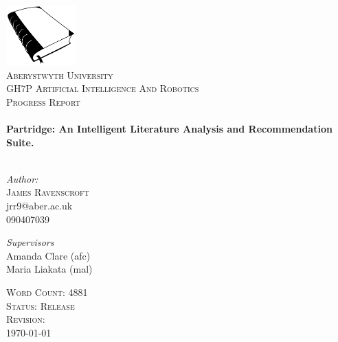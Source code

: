 \begin{titlepage}
 
\begin{center}

\includegraphics[width=0.20\textwidth]{../cover_logo.png}\\[1cm]


\textsc{\LARGE Aberystwyth University}\\[0.5cm]
\textsc{\LARGE GH7P Artificial Intelligence And Robotics}\\
\textsc{\LARGE Progress Report}\\[0.5cm]


 
\HRule \\[0.4cm]
{ \huge \bfseries Partridge: An Intelligent Literature Analysis and
Recommendation Suite.}\\[0.4cm]

\HRule \\[1.5cm]

\begin{minipage}{0.4\textwidth}
\begin{flushleft} \large
\emph{Author:}\\
\textsc{James Ravenscroft}\\
jrr9@aber.ac.uk\\
090407039\\
\end{flushleft}
\end{minipage}
\begin{minipage}{0.4\textwidth}
\begin{flushright} \large
\emph{Supervisors} \\
Amanda Clare (afc)\\
Maria Liakata (mal)

\end{flushright}
\end{minipage}

\vfill
 
\textsc{\large Word Count: 4881}\\
\textsc{\large Status: Release}\\
\textsc{\large Revision: \Revision{} }\\
{\large \today}
 
\end{center}
 
\end{titlepage}

